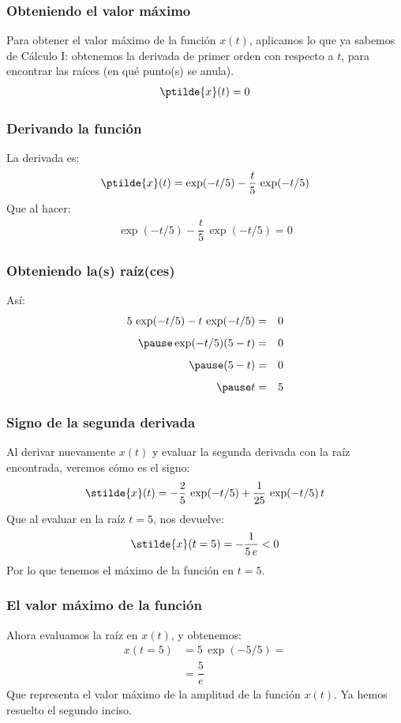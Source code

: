 \begin{frame}
\frametitle{Obteniendo el valor máximo}
Para obtener el valor máximo de la función $x(t)$, aplicamos lo que ya sabemos de Cálculo I: \pause obtenemos la derivada de primer orden con respecto a $t$, para encontrar las raíces (en qué punto(s) se anula).
\begin{align*}
\ptilde{x}(t) = 0
\end{align*}
\end{frame}
\begin{frame}
\frametitle{Derivando la función}
La derivada es:
\begin{align*}
\ptilde{x}(t) = \exp(-t/5) - \dfrac{t}{5} \, \exp(-t/5) 
\end{align*}
\pause
Que al hacer:
\begin{align*}
\exp(-t/5) - \dfrac{t}{5} \, \exp(-t/5) = 0
\end{align*}
\end{frame}
\begin{frame}
\frametitle{Obteniendo la(s) raíz(ces)}
Así:
\begin{eqnarray*}
5 \, \exp(-t/5) - t \, \exp(-t/5) &=& 0  \\[0.5em] \pause
\exp(-t/5) (5 - t) &=& 0 \\[0.5em] \pause
(5 - t) &=& 0 \\[0.5em] \pause
t &=& 5
\end{eqnarray*}
\end{frame}
\begin{frame}
\frametitle{Signo de la segunda derivada}
Al derivar nuevamente $x(t)$ y evaluar la segunda derivada con la raíz encontrada, veremos cómo es el signo:
\begin{align*}
\stilde{x}(t) = -\dfrac{2}{5} \, \exp(-t/5) + \dfrac{1}{25} \, \exp(-t/5) \, t
\end{align*}
\pause
Que al evaluar en la raíz $t = 5$, nos devuelve: \pause
\begin{align*}
\stilde{x}(t=5) = - \dfrac{1}{5 \, e} < 0
\end{align*}
\pause
Por lo que tenemos el máximo de la función en $t = 5$.
\end{frame}
\begin{frame}
\frametitle{El valor máximo de la función}
Ahora evaluamos la raíz en $x(t)$, y obtenemos:
\begin{align*}
x(t=5) &= 5 \, \exp (-5/5) = \\[0.5em]
&= \dfrac{5}{e}
\end{align*}
Que representa el valor máximo de la amplitud de la función $x(t)$. \pause Ya hemos resuelto el segundo inciso.
\end{frame}
